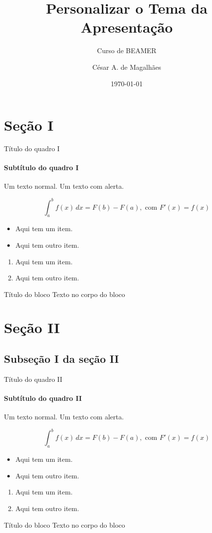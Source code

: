 \documentclass[aspectratio=169]{beamer}
\title{Personalizar o Tema da Apresentação}
\subtitle{Curso de BEAMER}
\author[César]{César A. de Magalhães}
\institute[UNOPAR]{Universidade do Norte do Paraná \\ https://vestibular.unoparead.com.br}
\date{\today}
\begin{document}
	\begin{frame}
		\titlepage
	\end{frame}
	
	\section{Seção I}
	\begin{frame}{Título do quadro I}
		\framesubtitle{Subtítulo do quadro I}
		
		Um texto normal. \alert{Um texto com alerta.}
		
		$$\int_a^b f(x)\, dx= F(b) - F(a), \text{ com } F'(x) = f(x)$$
		
		\begin{itemize}
			\item Aqui tem um item.
			\item Aqui tem outro item.
		\end{itemize}
		
		\begin{enumerate}
			\item Aqui tem um item.
			\item Aqui tem outro item.
		\end{enumerate}
		
		\begin{block}{Título do bloco}
			Texto no corpo do bloco
		\end{block}
	\end{frame}
	
	\section{Seção II}
	\subsection{Subseção I da seção II}
	\begin{frame}{Título do quadro II}
		\framesubtitle{Subtítulo do quadro II}
		
		Um texto normal. \alert{Um texto com alerta.}
		
		$$\int_a^b f(x)\, dx= F(b) - F(a), \text{ com } F'(x) = f(x)$$
		
		\begin{itemize}
			\item Aqui tem um item.
			\item Aqui tem outro item.
		\end{itemize}
		
		\begin{enumerate}
			\item Aqui tem um item.
			\item Aqui tem outro item.
		\end{enumerate}
		
		\begin{block}{Título do bloco}
			Texto no corpo do bloco
		\end{block}
	\end{frame}
	
\end{document}
